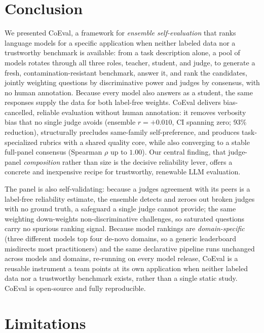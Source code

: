 \documentclass[11pt,a4paper]{article}
\begin{document}
\section{Conclusion}\label{conclusion}

We presented CoEval, a framework for \emph{ensemble self-evaluation} that ranks language models for a specific application when neither labeled data nor a trustworthy benchmark is available: from a task description alone, a pool of models rotates through all three roles, teacher, student, and judge, to generate a fresh, contamination-resistant benchmark, answer it, and rank the candidates, jointly weighting questions by discriminative power and judges by consensus, with no human annotation. Because every model also answers as a student, the same responses supply the data for both label-free weights. CoEval delivers
bias-cancelled, reliable evaluation without human annotation: it removes verbosity bias that no single judge avoids
(ensemble \(r = +0.010\), CI spanning zero; 93\% reduction), structurally precludes same-family self-preference, and
produces task-specialized rubrics with a shared quality core, while also converging
to a stable full-panel consensus (Spearman \(\rho\) up to \(1.00\)). Our
central finding, that judge-panel \emph{composition} rather than size is the decisive reliability lever, offers a
concrete and inexpensive recipe for trustworthy, renewable LLM evaluation.

The panel is also self-validating: because a
judge\textquotesingle s agreement with its peers is a label-free reliability estimate, the ensemble detects and zeroes out broken judges
with no ground truth, a safeguard a single judge cannot provide; the same weighting down-weights non-discriminative
challenges, so saturated questions carry no spurious ranking signal. Because model rankings are
\emph{domain-specific} (three different models top four de-novo domains, so a generic leaderboard misdirects most
practitioners) and the same declarative pipeline runs unchanged across models and domains, re-running on
every model release, CoEval is a reusable instrument a team points at its own application when neither labeled data nor
a trustworthy benchmark exists, rather than a single static study. CoEval is open-source and fully reproducible.

\section*{Limitations}\label{limitations}
\end{document}
